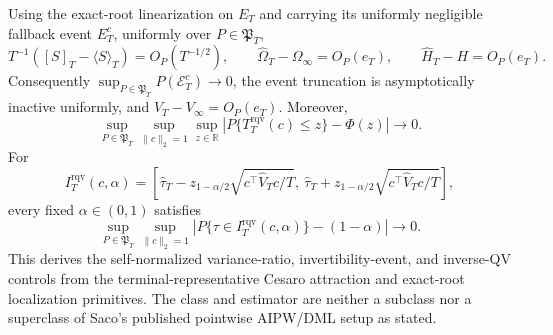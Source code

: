 Using the exact-root linearization on \(E_T\) and carrying its uniformly negligible fallback event \(E_T^c\), uniformly over \(P\in\mathfrak P_T\),
\[
 T^{-1}([S]_T-\langle S\rangle_T)=O_P(T^{-1/2}),\qquad
 \widehat\Omega_T-\Omega_\infty=O_P(e_T),\qquad
 \widehat H_T-H=O_P(e_T).
\]
Consequently \(\sup_{P\in\mathfrak P_T}P(\mathcal E_T^c)\to0\), the event truncation is asymptotically inactive uniformly, and \(\widehat V_T-V_\infty=O_P(e_T)\). Moreover,
\[
 \sup_{P\in\mathfrak P_T}\sup_{\|c\|_2=1}\sup_{z\in\mathbb R}
 \left|P\{T_T^{\mathrm{rqv}}(c)\le z\}-\Phi(z)\right|\longrightarrow0.
\]
For
\[
 I_T^{\mathrm{rqv}}(c,\alpha)=\left[\widehat\tau_T-z_{1-\alpha/2}\sqrt{c^\top\widehat V_Tc/T},\ 
 \widehat\tau_T+z_{1-\alpha/2}\sqrt{c^\top\widehat V_Tc/T}\right],
\]
every fixed \(\alpha\in(0,1)\) satisfies
\[
 \sup_{P\in\mathfrak P_T}\sup_{\|c\|_2=1}
 \left|P\{\tau\in I_T^{\mathrm{rqv}}(c,\alpha)\}-(1-\alpha)\right|\longrightarrow0.
\]
This derives the self-normalized variance-ratio, invertibility-event, and inverse-QV controls from the terminal-representative Cesaro attraction and exact-root localization primitives. The class and estimator are neither a subclass nor a superclass of Saco's published pointwise AIPW/DML setup as stated.